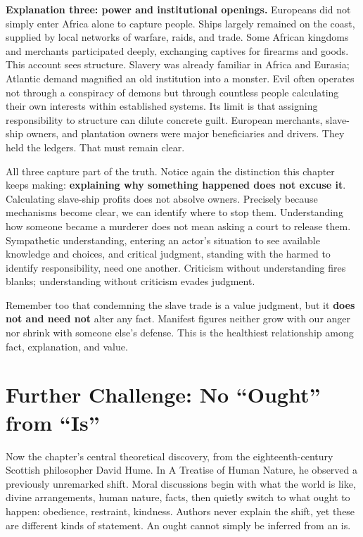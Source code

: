 \textbf{Explanation three: power and institutional openings.} Europeans did not simply enter Africa alone to capture people. Ships largely remained on the coast, supplied by local networks of warfare, raids, and trade. Some African kingdoms and merchants participated deeply, exchanging captives for firearms and goods. This account sees structure. Slavery was already familiar in Africa and Eurasia; Atlantic demand magnified an old institution into a monster. Evil often operates not through a conspiracy of demons but through countless people calculating their own interests within established systems. Its limit is that assigning responsibility to structure can dilute concrete guilt. European merchants, slave-ship owners, and plantation owners were major beneficiaries and drivers. They held the ledgers. That must remain clear.

All three capture part of the truth. Notice again the distinction this chapter keeps making: \textbf{explaining why something happened does not excuse it}. Calculating slave-ship profits does not absolve owners. Precisely because mechanisms become clear, we can identify where to stop them. Understanding how someone became a murderer does not mean asking a court to release them. Sympathetic understanding, entering an actor's situation to see available knowledge and choices, and critical judgment, standing with the harmed to identify responsibility, need one another. Criticism without understanding fires blanks; understanding without criticism evades judgment.

Remember too that condemning the slave trade is a value judgment, but it \textbf{does not and need not} alter any fact. Manifest figures neither grow with our anger nor shrink with someone else's defense. This is the healthiest relationship among fact, explanation, and value.

\section{Further Challenge: No ``Ought'' from ``Is''}
Now the chapter's central theoretical discovery, from the eighteenth-century Scottish philosopher David Hume. In A Treatise of Human Nature, he observed a previously unremarked shift. Moral discussions begin with what the world is like, divine arrangements, human nature, facts, then quietly switch to what ought to happen: obedience, restraint, kindness. Authors never explain the shift, yet these are different kinds of statement. An ought cannot simply be inferred from an is.


